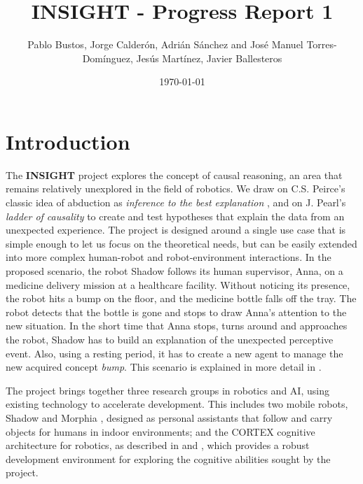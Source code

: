 \documentclass[a4paper, twoside]{article}
\date{\monthyeardate\today}
\author{Pablo Bustos, Jorge Calderón, Adrián Sánchez and José Manuel Torres-Domínguez, Jesús Martínez, Javier Ballesteros}
\title{INSIGHT - Progress Report 1}
\begin{document}


\maketitle

\section{Introduction}

The \textbf{INSIGHT} project explores the concept of causal reasoning, an area that remains relatively unexplored in the field of robotics. We draw on C.S. Peirce's classic idea of abduction as \textit{inference to the best explanation} \cite{peirce1883theory}, and on J. Pearl's \textit{ladder of causality} \cite{pearl2018bookofwhy} to create and test hypotheses that explain the data from an unexpected experience. The project is designed around a single use case that is simple enough to let us focus on the theoretical needs, but can be easily extended into more complex human-robot and robot-environment interactions. 
In the proposed scenario, the robot Shadow follows its human supervisor, Anna, on a medicine delivery mission at a healthcare facility. Without noticing its presence, the robot hits a bump on the floor, and the medicine bottle falls off the tray. The robot detects that the bottle is gone and stops to draw Anna's attention to the new situation. In the short time that Anna stops, turns around and approaches the robot, Shadow has to build an explanation of the unexpected perceptive event. Also, using a resting period, it has to create a new agent to manage the new acquired concept \textit{bump}. This scenario is explained in more detail in \cite{bustos2025insight}. 
    
The project brings together three research groups in robotics and AI, using existing technology to accelerate development. This includes two mobile robots, Shadow \cite{torrejon_design_2024} and Morphia \cite{crucesSociallyAssistiveRobots2024}, designed as personal assistants that follow and carry objects for humans in indoor environments; and the CORTEX cognitive architecture for robotics, as described in  \cite{luis-pablo-cortex} and \cite{calderita_estevez_deep_2015}, which provides a robust development environment for exploring the cognitive abilities sought by the project.
    
\end{document}
